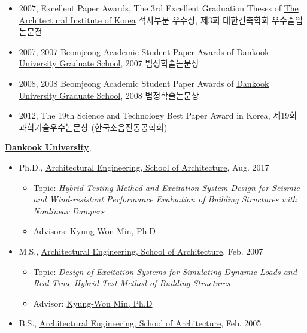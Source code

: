 \documentclass[10pt,a4paper,ragged2e]{altacv}
\begin{document}
\clearpage
\begin{fullwidth}

\nocite{*}
\begin{itemize}
\item 2007, Excellent Paper Awards, The 3rd Excellent Graduation Theses of \href{http://www.aik.or.kr}{The Architectural Institute of Korea} 석사부문 우수상, 제3회 대한건축학회 우수졸업논문전
\item 2007, 2007 Beomjeong Academic Student Paper Awards of \href{http://cms.dankook.ac.kr/web/grad}{Dankook University Graduate School}, 2007 범정학술논문상
\item 2008, 2008 Beomjeong Academic Student Paper Awards of \href{http://cms.dankook.ac.kr/web/grad}{Dankook University Graduate School}, 2008 범정학술논문상
\item 2012, The 19th Science and Technology Best Paper Award in Korea, 제19회 과학기술우수논문상 (한국소음진동공학회)
\end{itemize}


\nocite{*}
\href{http://www.dankook.ac.kr/}{\textbf{Dankook University}},
\begin{itemize}
\item Ph.D., \href{http://cms.dankook.ac.kr/web/archi} {Architectural Engineering, School of Architecture}, Aug. 2017
\begin{itemize}
  \item Topic: \emph{Hybrid Testing Method and Excitation System Design for Seismic and Wind-resistant Performance Evaluation of Building Structures with Nonlinear Dampers}
  \item Advisors: \href{http://cms.dankook.ac.kr/web/archi/-16?p_p_id=DeptInfo_WAR_empInfoportlet&p_p_lifecycle=0&p_p_state=normal&p_p_mode=view&p_p_col_id=column-2&p_p_col_count=1&_DeptInfo_WAR_empInfoportlet_empId=2zEyEnhbhLlys2HRljBFWg%3D%3D&_DeptInfo_WAR_empInfoportlet_action=view_message}{Kyung-Won Min, Ph.D}
\end{itemize}

\item M.S., \href{http://cms.dankook.ac.kr/web/archi} {Architectural Engineering, School of Architecture}, Feb. 2007
\begin{itemize}
  \item Topic: \emph{Design of Excitation Systems for Simulating Dynamic Loads and Real-Time Hybrid Test Method of Building Structures}
  \item Advisor: \href{http://cms.dankook.ac.kr/web/archi/-16?p_p_id=DeptInfo_WAR_empInfoportlet&p_p_lifecycle=0&p_p_state=normal&p_p_mode=view&p_p_col_id=column-2&p_p_col_count=1&_DeptInfo_WAR_empInfoportlet_empId=2zEyEnhbhLlys2HRljBFWg%3D%3D&_DeptInfo_WAR_empInfoportlet_action=view_message} {Kyung-Won Min, Ph.D}
\end{itemize}
\item B.S., \href{http://cms.dankook.ac.kr/web/archi}{Architectural Engineering, School of Architecture}, Feb. 2005
\end{itemize}


\end{fullwidth}
\end{document}
